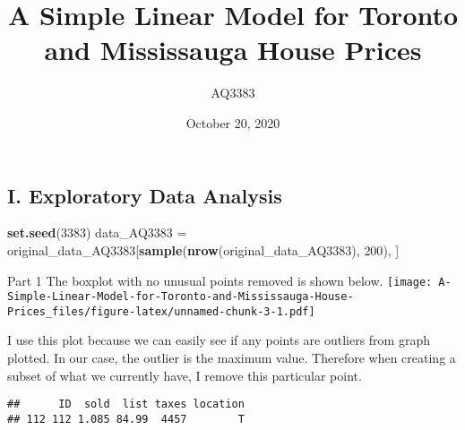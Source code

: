 \documentclass[
]{article}
\title{A Simple Linear Model for Toronto and Mississauga House Prices}
\author{AQ3383}
\date{October 20, 2020}
\newenvironment{Shaded}{\begin{snugshade}}{\end{snugshade}}
\newcommand{\CommentTok}[1]{\textcolor[rgb]{0.56,0.35,0.01}{\textit{#1}}}
\newcommand{\DecValTok}[1]{\textcolor[rgb]{0.00,0.00,0.81}{#1}}
\newcommand{\KeywordTok}[1]{\textcolor[rgb]{0.13,0.29,0.53}{\textbf{#1}}}
\newcommand{\NormalTok}[1]{#1}
\newcommand{\OperatorTok}[1]{\textcolor[rgb]{0.81,0.36,0.00}{\textbf{#1}}}
\newcommand{\StringTok}[1]{\textcolor[rgb]{0.31,0.60,0.02}{#1}}
\begin{document}
\maketitle

\hypertarget{i.-exploratory-data-analysis}{%
\subsection{I. Exploratory Data
Analysis}\label{i.-exploratory-data-analysis}}

\begin{Shaded}
\begin{Highlighting}[]
\KeywordTok{set.seed}\NormalTok{(}\DecValTok{3383}\NormalTok{)}
\NormalTok{data_AQ3383 =}\StringTok{ }\NormalTok{original_data_AQ3383[}\KeywordTok{sample}\NormalTok{(}\KeywordTok{nrow}\NormalTok{(original_data_AQ3383), }\DecValTok{200}\NormalTok{), ]}
\end{Highlighting}
\end{Shaded}

Part 1 The boxplot with no unusual points removed is shown below.
\texttt{[image: A-Simple-Linear-Model-for-Toronto-and-Mississauga-House-Prices\_files/figure-latex/unnamed-chunk-3-1.pdf]}

I use this plot because we can easily see if any points are outliers
from graph plotted. In our case, the outlier is the maximum value.
Therefore when creating a subset of what we currently have, I remove
this particular point.

\begin{Shaded}
\end{Shaded}

\begin{verbatim}
##      ID  sold  list taxes location
## 112 112 1.085 84.99  4457        T
\end{verbatim}

\begin{Shaded}
\end{Shaded}
\end{document}
